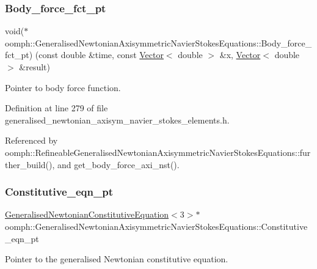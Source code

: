 \subsubsection{\texorpdfstring{Body\+\_\+force\+\_\+fct\+\_\+pt}{Body\_force\_fct\_pt}}
{\footnotesize\ttfamily void($\ast$ oomph\+::\+Generalised\+Newtonian\+Axisymmetric\+Navier\+Stokes\+Equations\+::\+Body\+\_\+force\+\_\+fct\+\_\+pt) (const double \&time, const \hyperlink{classoomph_1_1Vector}{Vector}$<$ double $>$ \&x, \hyperlink{classoomph_1_1Vector}{Vector}$<$ double $>$ \&result)\hspace{0.3cm}{\ttfamily [protected]}}



Pointer to body force function. 



Definition at line 279 of file generalised\+\_\+newtonian\+\_\+axisym\+\_\+navier\+\_\+stokes\+\_\+elements.\+h.



Referenced by oomph\+::\+Refineable\+Generalised\+Newtonian\+Axisymmetric\+Navier\+Stokes\+Equations\+::further\+\_\+build(), and get\+\_\+body\+\_\+force\+\_\+axi\+\_\+nst().

\mbox{\label{classoomph_1_1GeneralisedNewtonianAxisymmetricNavierStokesEquations_a5bee3e30afd3e82c9cdec5c57466366a}} 
\subsubsection{\texorpdfstring{Constitutive\+\_\+eqn\+\_\+pt}{Constitutive\_eqn\_pt}}
{\footnotesize\ttfamily \hyperlink{classoomph_1_1GeneralisedNewtonianConstitutiveEquation}{Generalised\+Newtonian\+Constitutive\+Equation}$<$3$>$$\ast$ oomph\+::\+Generalised\+Newtonian\+Axisymmetric\+Navier\+Stokes\+Equations\+::\+Constitutive\+\_\+eqn\+\_\+pt\hspace{0.3cm}{\ttfamily [protected]}}



Pointer to the generalised Newtonian constitutive equation. 



